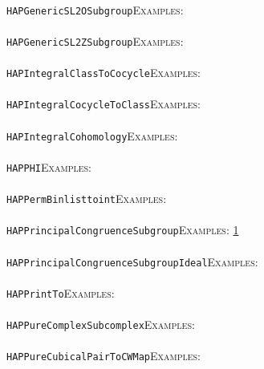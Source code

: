 \documentclass[a4paper,11pt]{report}
\begin{document}
{{ \\
 \texttt{HAP{\textunderscore}GenericSL2OSubgroup}{\nobreakspace}{\nobreakspace}{\nobreakspace}{\nobreakspace}\textsc{Examples:} \\
 \\
 \texttt{HAP{\textunderscore}GenericSL2ZSubgroup}{\nobreakspace}{\nobreakspace}{\nobreakspace}{\nobreakspace}\textsc{Examples:} \\
 \\
 \texttt{HAP{\textunderscore}IntegralClassToCocycle}{\nobreakspace}{\nobreakspace}{\nobreakspace}{\nobreakspace}\textsc{Examples:} \\
 \\
 \texttt{HAP{\textunderscore}IntegralCocycleToClass}{\nobreakspace}{\nobreakspace}{\nobreakspace}{\nobreakspace}\textsc{Examples:} \\
 \\
 \texttt{HAP{\textunderscore}IntegralCohomology}{\nobreakspace}{\nobreakspace}{\nobreakspace}{\nobreakspace}\textsc{Examples:} \\
 \\
 \texttt{HAP{\textunderscore}PHI}{\nobreakspace}{\nobreakspace}{\nobreakspace}{\nobreakspace}\textsc{Examples:} \\
 \\
 \texttt{HAP{\textunderscore}PermBinlisttoint}{\nobreakspace}{\nobreakspace}{\nobreakspace}{\nobreakspace}\textsc{Examples:} \\
 \\
 \texttt{HAP{\textunderscore}PrincipalCongruenceSubgroup}{\nobreakspace}{\nobreakspace}{\nobreakspace}{\nobreakspace}\textsc{Examples:} \href{tutorial/chap10.html} {1}{\nobreakspace} \\
 \\
 \texttt{HAP{\textunderscore}PrincipalCongruenceSubgroupIdeal}{\nobreakspace}{\nobreakspace}{\nobreakspace}{\nobreakspace}\textsc{Examples:} \\
 \\
 \texttt{HAP{\textunderscore}PrintTo}{\nobreakspace}{\nobreakspace}{\nobreakspace}{\nobreakspace}\textsc{Examples:} \\
 \\
 \texttt{HAP{\textunderscore}PureComplexSubcomplex}{\nobreakspace}{\nobreakspace}{\nobreakspace}{\nobreakspace}\textsc{Examples:} \\
 \\
 \texttt{HAP{\textunderscore}PureCubicalPairToCWMap}{\nobreakspace}{\nobreakspace}{\nobreakspace}{\nobreakspace}\textsc{Examples:} \\
}}
\end{document}
